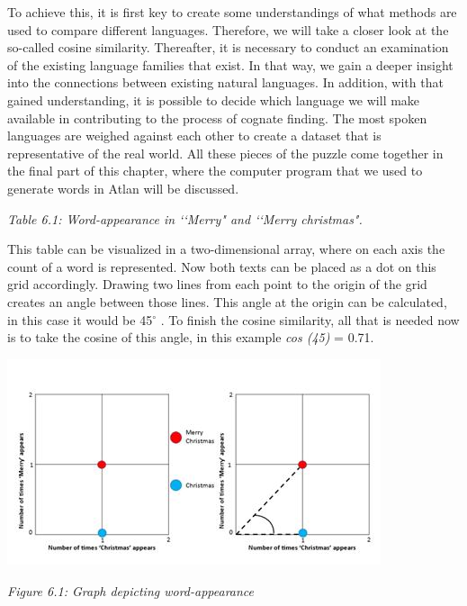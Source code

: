 To achieve this, it is first key to create some understandings of what methods are used to compare different languages. Therefore, we will take a closer look at the so-called cosine similarity. Thereafter, it is necessary to conduct an examination of the existing language families that exist. In that way, we gain a deeper insight into the connections between existing natural languages. In addition, with that gained understanding, it is possible to decide which language we will make available in contributing to the process of cognate finding. The most spoken languages are weighed against each other to create a dataset that is representative of the real world. All these pieces of the puzzle come together in the final part of this chapter, where the computer program that we used to generate words in Atlan will be discussed.
\vspace{0.3cm}

\begin{center}

{\it \footnotesize Table 6.1: Word-appearance in \lq\lq Merry" and \lq\lq Merry christmas".}
\end{center}

 \noindent This table can be visualized in a two-dimensional array, where on each axis the count of a word is represented. Now both texts can be placed as a dot on this grid accordingly. Drawing two lines from each point to the origin of the grid creates an angle between those lines. This angle at the origin can be calculated, in this case it would be 45$^{\circ}$ . To finish the cosine similarity, all that is needed now is to take the cosine of this angle, in this example \textit{cos (45)} = 0.71. 


\begin{center}
	\includegraphics[scale=0.6]{./Images/graphs.jpg}

	{\it \footnotesize Figure 6.1: Graph depicting word-appearance}
\end{center}

